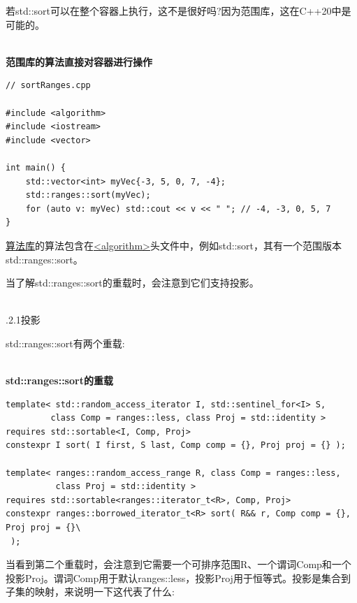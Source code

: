若std::sort可以在整个容器上执行，这不是很好吗?因为范围库，这在C++20中是可能的。

\hspace*{\fill} \\ %
\noindent
\textbf{范围库的算法直接对容器进行操作}
\begin{lstlisting}[style=styleCXX]
// sortRanges.cpp

#include <algorithm>
#include <iostream>
#include <vector>

int main() {
	std::vector<int> myVec{-3, 5, 0, 7, -4};
	std::ranges::sort(myVec);
	for (auto v: myVec) std::cout << v << " "; // -4, -3, 0, 5, 7
}
\end{lstlisting}

\href{https://en.cppreference.com/w/cpp/algorithm}{算法库}的算法包含在\href{https://en.cppreference.com/w/cpp/header/algorithm}{<algorithm>}头文件中，例如std::sort，其有一个范围版本std::ranges::sort。

当了解std::ranges::sort的重载时，会注意到它们支持投影。

\hspace*{\fill} \\ %
.2.1\hspace{0.2cm}投影

std::ranges::sort有两个重载:

\hspace*{\fill} \\ %
\noindent
\textbf{std::ranges::sort的重载}
\begin{lstlisting}[style=styleCXX]
template< std::random_access_iterator I, std::sentinel_for<I> S,
         class Comp = ranges::less, class Proj = std::identity >
requires std::sortable<I, Comp, Proj>
constexpr I sort( I first, S last, Comp comp = {}, Proj proj = {} );

template< ranges::random_access_range R, class Comp = ranges::less,
          class Proj = std::identity >
requires std::sortable<ranges::iterator_t<R>, Comp, Proj>
constexpr ranges::borrowed_iterator_t<R> sort( R&& r, Comp comp = {}, Proj proj = {}\
 );
\end{lstlisting}

当看到第二个重载时，会注意到它需要一个可排序范围R、一个谓词Comp和一个投影Proj。谓词Comp用于默认ranges::less，投影Proj用于恒等式。投影是集合到子集的映射，来说明一下这代表了什么:

